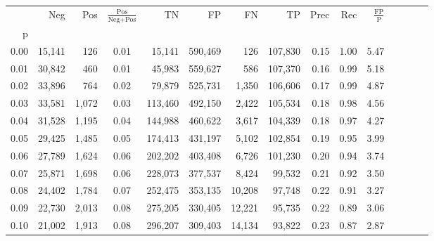 \begin{tabular}{rrrcrrrrrrrrrrr}
\toprule
{} &     Neg &    Pos & $\frac{\text{Pos}}{\text{Neg}+\text{Pos}}$ &       TN &       FP &       FN &       TP &  Prec &   Rec & $\frac{\text{FP}}{\text{P}}$ \\
p    &         &        &                                            &          &          &          &          &       &       &                              \\
\midrule
0.00 &  15,141 &    126 &                                       0.01 &   15,141 &  590,469 &      126 &  107,830 &  0.15 &  1.00 &                         5.47 \\
0.01 &  30,842 &    460 &                                       0.01 &   45,983 &  559,627 &      586 &  107,370 &  0.16 &  0.99 &                         5.18 \\
0.02 &  33,896 &    764 &                                       0.02 &   79,879 &  525,731 &    1,350 &  106,606 &  0.17 &  0.99 &                         4.87 \\
0.03 &  33,581 &  1,072 &                                       0.03 &  113,460 &  492,150 &    2,422 &  105,534 &  0.18 &  0.98 &                         4.56 \\
0.04 &  31,528 &  1,195 &                                       0.04 &  144,988 &  460,622 &    3,617 &  104,339 &  0.18 &  0.97 &                         4.27 \\
0.05 &  29,425 &  1,485 &                                       0.05 &  174,413 &  431,197 &    5,102 &  102,854 &  0.19 &  0.95 &                         3.99 \\
0.06 &  27,789 &  1,624 &                                       0.06 &  202,202 &  403,408 &    6,726 &  101,230 &  0.20 &  0.94 &                         3.74 \\
0.07 &  25,871 &  1,698 &                                       0.06 &  228,073 &  377,537 &    8,424 &   99,532 &  0.21 &  0.92 &                         3.50 \\
0.08 &  24,402 &  1,784 &                                       0.07 &  252,475 &  353,135 &   10,208 &   97,748 &  0.22 &  0.91 &                         3.27 \\
0.09 &  22,730 &  2,013 &                                       0.08 &  275,205 &  330,405 &   12,221 &   95,735 &  0.22 &  0.89 &                         3.06 \\
0.10 &  21,002 &  1,913 &                                       0.08 &  296,207 &  309,403 &   14,134 &   93,822 &  0.23 &  0.87 &                         2.87 \\

\end{tabular}
